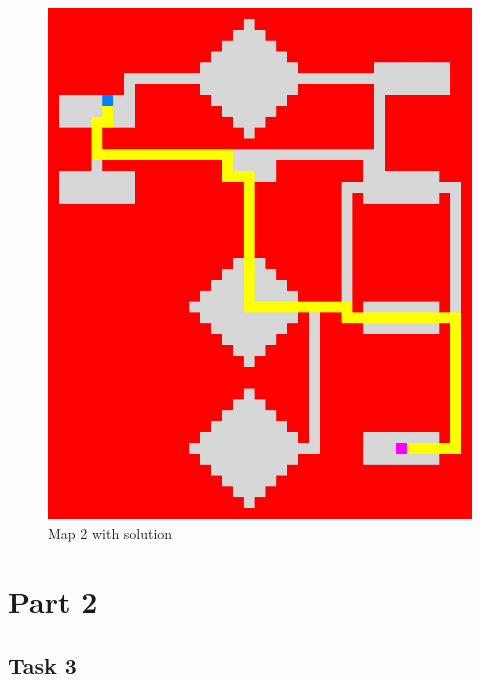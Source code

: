 \documentclass{article}
\begin{document}
\begin{figure}[!h]
\begin{minipage}{0.4\textwidth}
		\includegraphics[width=\textwidth]{images/map2_solution}
    		\caption{Map 2 with solution}
	\end{minipage}
\end{figure}

\newpage

\section{Part 2}
\subsection{Task 3}
\end{document}
